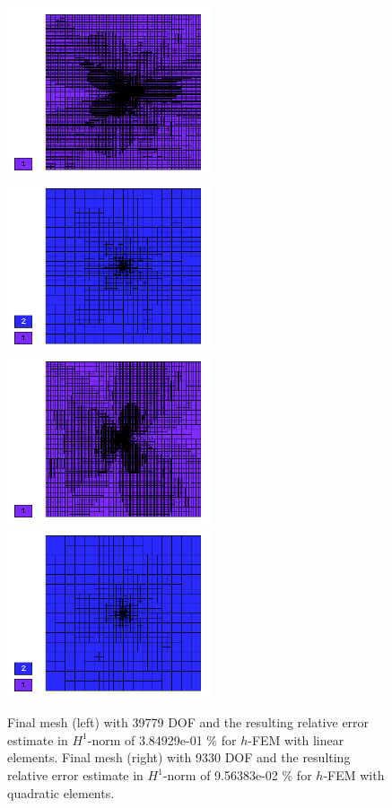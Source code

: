 \documentclass[12pt]{elsarticle}
\begin{document}
\begin{figure}[H]
\centering
\vspace{-3mm}
\includegraphics[height=5cm]{nist/nist-3/mesh_u_h1_aniso.png}
\includegraphics[height=5cm]{nist/nist-3/mesh_u_h2_aniso.png}\ \
\includegraphics[height=5cm]{nist/nist-3/mesh_v_h1_aniso.png}
\includegraphics[height=5cm]{nist/nist-3/mesh_v_h2_aniso.png}
\vspace{-3mm}
\caption{
Final mesh (left) with 39779 DOF and the resulting
relative error estimate in $H^1$-norm of 3.84929e-01 \% for $h$-FEM with linear elements.
Final mesh (right) with 9330 DOF and the resulting
relative error estimate in $H^1$-norm of 9.56383e-02 \% for $h$-FEM with quadratic elements.}
\vspace{-4mm}
\label{fig:nist-3-h-aniso}
\end{figure}
\end{document}
